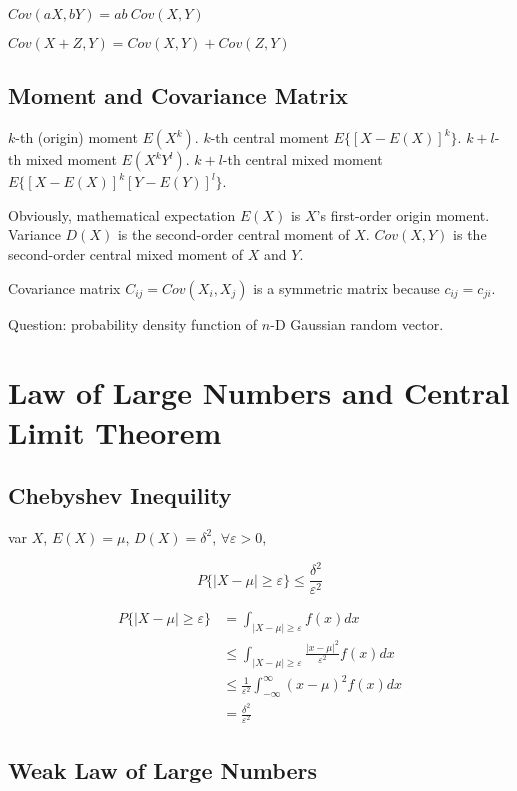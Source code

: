 $Cov(aX,bY) = ab~ Cov(X,Y)$

 $Cov(X+Z, Y) = Cov(X,Y) + Cov(Z,Y)$

\subsection{Moment and Covariance Matrix}

 $k$-th (origin) moment $E(X^k)$. $k$-th central moment $E\{[X-E(X)]^k\}$.
 $k+l$-th mixed moment $E(X^kY^l)$.
 $k+l$-th central mixed moment $E\{[X-E(X)]^k[Y-E(Y)]^l\}$.

 Obviously, mathematical expectation $E(X)$ is $X$'s first-order origin
 moment. Variance $D(X)$ is the second-order central moment of $X$.
 $Cov(X,Y)$ is the second-order central mixed moment of $X$ and $Y$.

 Covariance matrix $C_{ij} = Cov(X_i,X_j)$ is a symmetric matrix because
 $c_{ij} = c_{ji}$.

 Question: probability density function of $n$-D Gaussian random vector.

\section{Law of Large Numbers and Central Limit Theorem}

 \subsection{Chebyshev Inequility}
 var $X$, $E(X)=\mu$, $D(X)=\delta^2$, $\forall \varepsilon >0$,

 $$ P \big\{ \big| X - \mu \big| \geqslant \varepsilon \big\} 
   \leqslant \frac{\delta^2}{\varepsilon^2} $$

 \begin{align*}
	 P \big\{ \big| X - \mu \big| \geqslant \varepsilon \big\} &=
		\int_{|X-\mu|\geq \varepsilon} f(x)dx \\
		&\leq \int_{|X-\mu|\geq \varepsilon} \frac{|x-\mu|^2}{\varepsilon^2}
			f(x)dx \\
		&\leq \frac{1}{\varepsilon^2} \int^\infty_{-\infty} (x-\mu)^2 f(x)dx\\
		&= \frac{\delta^2}{\varepsilon^2}
 \end{align*}

 \subsection{Weak Law of Large Numbers}

